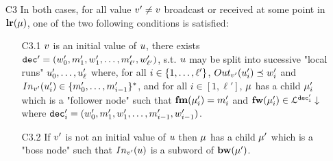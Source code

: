 \begin{definition}
\begin{itemize}
		\item[C3\namedlabel{unfoldingC3}{C3}] In both cases, for all value $v' \neq v$ broadcast or received at some point in $\mathbf{lr}(\mu)$, one of the two following conditions is satisfied:
		\begin{itemize}
			\item[C3.1\namedlabel{unfoldingC3.1}{C3.1}]
			 $v$ is an initial value of $u$, 
			there exists $\mathtt{dec}' = (w'_0, m'_1, w'_1, \ldots, m'_{\ell'}, w'_{\ell'})$, s.t. $u$ may be split into sucessive "local runs" $u'_0, \dots, u'_{\ell}$ where, for all $i \in \{1,\dots,\ell'\}$, $\voutput{\aval'}{\localrun'_i} \subword w'_i$ and $\vinput{\aval'}{\localrun'_i} \in \set{m'_0, \dots, m'_{i-1}}^*$, and
			for all $i \in [1,\ell']$, $\mu$ has a child $\mu'_i$ which is a "follower node" such that $\mathbf{fm}(\mu'_i) = m'_i$ and $\mathbf{fw}(\mu'_i) \in\mathcal{L}^{\mathtt{\mathtt{dec}'_i}}\downarrow$ where $\mathtt{dec}'_i = (w'_0, m'_1, w'_1, \ldots, m'_{i-1}, w'_{i-1})$.
			
			\item[C3.2\namedlabel{unfoldingC3.2}{C3.2}] If $v'$ is not an initial value of $u$ then $\mu$ has a child $\mu'$ which is a "boss node" such that $\vinput{\aval'}{\localrun}$ is a subword of $\mathbf{bw}(\mu')$.
		\end{itemize}
	\end{itemize}
	
	
\end{definition}


